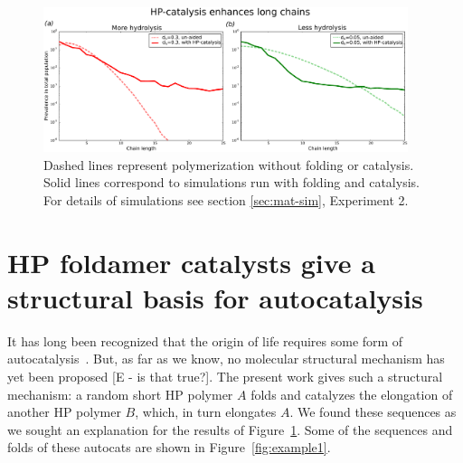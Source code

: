 \documentclass[journal=jacsat,manuscript=article,layout=twocolumn]{achemso}
\begin{document}
\begin{figure}[h!]
  \centering
  \includegraphics[width=0.95\textwidth]{pictures/flory-and-hp.pdf} 
  \caption{Dashed lines represent polymerization without folding or catalysis. Solid lines 
correspond to simulations run with folding and catalysis. For details of simulations see 
section \ref{sec:mat-sim}, Experiment 2. }
  \label{fig:sim.flory-fold}
\end{figure}


\section{HP foldamer catalysts give a structural basis for autocatalysis}

 It has long been recognized that the origin of life requires some form of 
autocatalysis~\cite{Kauffman1986,Dyson1985,Eigen1978}.  But, as far as we know, no molecular 
structural mechanism has yet been proposed [E - is that true?].  The present work gives such a 
structural mechanism: a random short HP polymer $A$ folds and catalyzes the elongation of another HP 
polymer $B$, which, in turn elongates $A$.  We found these sequences as we sought an explanation for 
the results of Figure~\ref{fig:sim.flory-fold}.  Some of the sequences and folds of these autocats 
are shown in Figure~\ref{fig:example1}.
\end{document}
